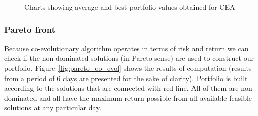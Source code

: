 \begin{figure}[htb]
  \caption{Charts showing average and best portfolio values obtained for CEA}
\label{fig:co-evol-ave-2010-com}
\end{figure}


\subsubsection{Pareto front}

Because co-evolutionary algorithm operates in terms of risk and return we can check if the non dominated solutions (in Pareto sense) are used to construct our portfolio.
Figure~\ref{fig:pareto_co_evol} shows the results of computation (results from a period of 6 days are presented for the sake of clarity). 
Portfolio is built according to the solutions that are connected with red line.
All of them are non dominated and all have the maximum return possible from all available feasible solutions at any particular day.


